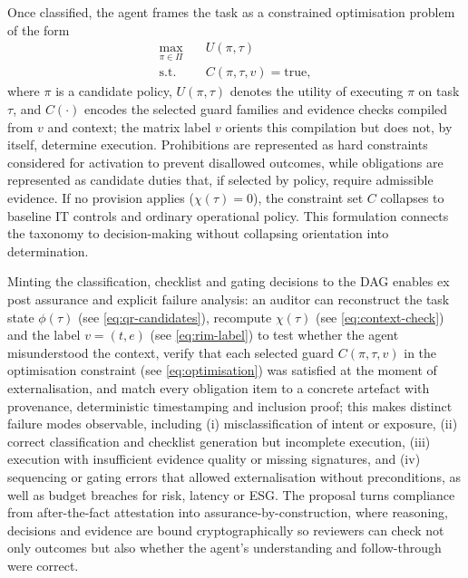 \documentclass[oneside,10pt]{swissi}
\begin{document}
Once classified, the agent frames the task as a constrained optimisation problem of the form
\begin{equation}
\begin{aligned}
\max_{\pi \in \Pi} \quad & U(\pi,\tau) \\
\text{s.t.} \quad & C(\pi,\tau,v) = \text{true},
\end{aligned}
\label{eq:optimisation}
\end{equation}
where \(\pi\) is a candidate policy, \(U(\pi,\tau)\) denotes the utility of executing \(\pi\) on task \(\tau\), and \(C(\cdot)\) encodes the selected guard families and evidence checks compiled from \(v\) and context; the matrix label \(v\) orients this compilation but does not, by itself, determine execution. Prohibitions are represented as hard constraints considered for activation to prevent disallowed outcomes, while obligations are represented as candidate duties that, if selected by policy, require admissible evidence. If no provision applies (\(\chi(\tau)=0\)), the constraint set \(C\) collapses to baseline IT controls and ordinary operational policy. This formulation connects the taxonomy to decision-making without collapsing orientation into determination.

Minting the classification, checklist and gating decisions to the DAG enables ex post assurance and explicit failure analysis: an auditor can reconstruct the task state \(\phi(\tau)\) (see \eqref{eq:qr-candidates}), recompute \(\chi(\tau)\) (see \eqref{eq:context-check}) and the label \(v=(t,e)\) (see \eqref{eq:rim-label}) to test whether the agent misunderstood the context, verify that each selected guard \(C(\pi,\tau,v)\) in the optimisation constraint (see \eqref{eq:optimisation}) was satisfied at the moment of externalisation, and match every obligation item to a concrete artefact with provenance, deterministic timestamping and inclusion proof; this makes distinct failure modes observable, including (i) misclassification of intent or exposure, (ii) correct classification and checklist generation but incomplete execution, (iii) execution with insufficient evidence quality or missing signatures, and (iv) sequencing or gating errors that allowed externalisation without preconditions, as well as budget breaches for risk, latency or ESG. The proposal turns compliance from after-the-fact attestation into assurance-by-construction, where reasoning, decisions and evidence are bound cryptographically so reviewers can check not only outcomes but also whether the agent’s understanding and follow-through were correct.
\end{document}
